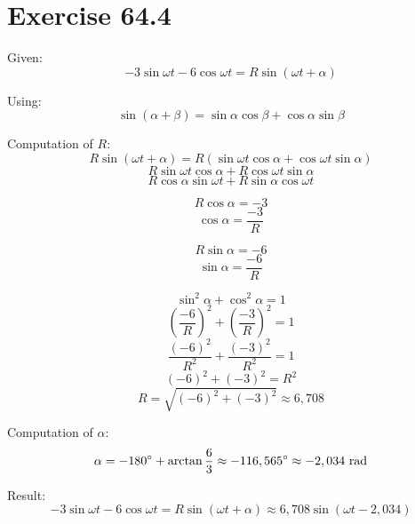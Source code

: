 \documentclass[a4paper, 10pt]{scrartcl}
\begin{document}
\section{Exercise 64.4}

Given:
\[-3\sin{\omega t} - 6\cos{\omega t} = R\sin{(\omega t + \alpha)}\]

Using:
\[\sin{(\alpha + \beta)} = \sin{\alpha}\cos{\beta} + \cos{\alpha}\sin{\beta}\]

Computation of $R$:
\[R\sin{(\omega t + \alpha)} =
R(\sin{\omega t}\cos{\alpha} + \cos{\omega t}\sin{\alpha})\]
\[R\sin{\omega t}\cos{\alpha} + R\cos{\omega t}\sin{\alpha}\]
\[R\cos{\alpha}\sin{\omega t} + R\sin{\alpha}\cos{\omega t}\]

\[R\cos{\alpha} = -3\]
\[\cos{\alpha} = \frac{-3}{R}\]

\[R\sin{\alpha} = -6\]
\[\sin{\alpha} = \frac{-6}{R}\]

\[\sin^{2}{\alpha} + \cos^{2}{\alpha} = 1\]
\[\left(\frac{-6}{R}\right)^{2} + \left(\frac{-3}{R}\right)^{2} = 1\]
\[\frac{(-6)^{2}}{R^{2}} + \frac{(-3)^{2}}{R^{2}} = 1\]
\[(-6)^{2} + (-3)^{2} = R^{2}\]
\[R = \sqrt{(-6)^{2} + (-3)^{2}} \approx 6,708\]

Computation of $\alpha$:
\[\alpha = -180^\circ + \arctan{\frac{6}{3}}
\approx -116,565^\circ \approx -2,034\textnormal{ rad}\]

Result:
\[-3\sin{\omega t} - 6\cos{\omega t} = R\sin{(\omega t + \alpha)} \approx
6,708\sin{(\omega t - 2,034)}\]
\end{document}

